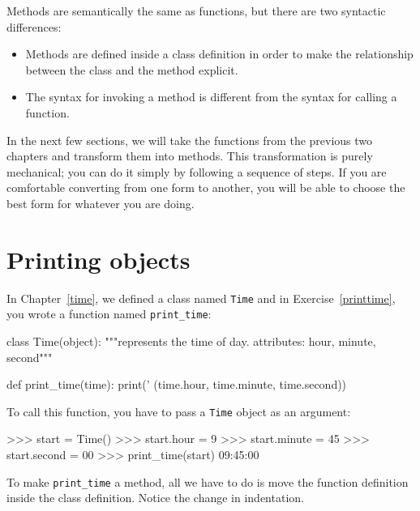 
Methods are semantically the same as functions, but there are
two syntactic differences:

\begin{itemize}

\item Methods are defined inside a class definition in order
to make the relationship between the class and the method explicit.

\item The syntax for invoking a method is different from the
syntax for calling a function.

\end{itemize}

In the next few sections, we will take the functions from the previous
two chapters and transform them into methods.  This transformation is
purely mechanical; you can do it simply by following a sequence of
steps.  If you are comfortable converting from one form to another,
you will be able to choose the best form for whatever you are doing.


\section{Printing objects}
\label{print_time}


In Chapter~\ref{time}, we defined a class named
{\tt Time} and in Exercise~\ref{printtime}, you 
wrote a function named \verb"print_time":

\beforeverb
\begin{pycode}
class Time(object):
    """represents the time of day.
       attributes: hour, minute, second"""

def print_time(time):
    print('%
          (time.hour, time.minute, time.second))
\end{pycode}
\afterverb
%
To call this function, you have to pass a {\tt Time} object as an
argument:

\beforeverb
\begin{pyinterpreter}
>>> start = Time()
>>> start.hour = 9
>>> start.minute = 45
>>> start.second = 00
>>> print_time(start)
09:45:00
\end{pyinterpreter}
\afterverb
%
To make \verb"print_time" a method, all we have to do is
move the function definition inside the class definition.  Notice
the change in indentation.


